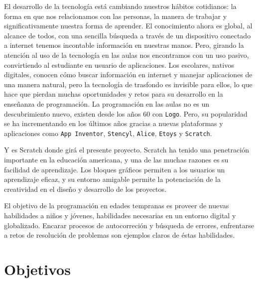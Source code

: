 \documentclass[a4paper, 12pt]{book}
\begin{document}
El desarrollo de la tecnología está cambiando nuestros hábitos cotidianos: la forma
en que nos relacionamos con las personas, la manera de trabajar y significativamente
nuestra forma de aprender. El conocimiento ahora es global, al alcance de todos, con
una sencilla búsqueda a través de un dispositivo conectado a internet tenemos incontable
información en nuestras manos. Pero, girando la atención al uso de la tecnología en las 
aulas nos encontramos con un uso pasivo, convirtiendo al estudiante en usuario de 
aplicaciones. Los escolares, nativos digitales, conocen cómo buscar información en internet 
y manejar aplicaciones de una manera natural, pero la tecnología de trasfondo es invisible 
para ellos, lo que hace que pierdan muchas oportunidades y retos para su desarrollo en la
enseñanza de programación.
La programación en las aulas no es un descubrimiento nuevo, existen desde los años 60  con 
\texttt{Logo}. Pero, su popularidad se ha incrementando en los últimos años gracias a nuevas 
plataformas y aplicaciones como \texttt{App Inventor}, \texttt{Stencyl}, \texttt{Alice}, 
\texttt{Etoys} y \texttt{Scratch}.

Y es Scratch donde girá el presente proyecto. Scratch ha tenido una penetración importante 
en la educación americana, y una de las muchas razones es su facilidad de aprendizaje. Los
bloques gráficos permiten a los usuarios un aprendizaje eficaz, y su entorno amigable permite 
la potenciación de la creatividad en el diseño y desarrollo de los proyectos.

El objetivo de la programación en edades tempranas es proveer de nuevas habilidades a niños y
jóvenes, habilidades necesarias en un entorno digital y globalizado. Encarar procesos de
autocorreción y búsqueda de errores, enfrentarse a retos de resolución de problemas son ejemplos
claros de éstas habilidades.








\cleardoublepage
\chapter{Objetivos}
\label{chap:objetivos}
\end{document}
